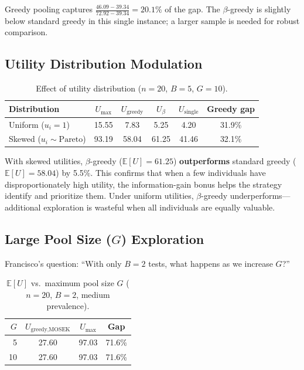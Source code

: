 \documentclass[11pt,a4paper]{article}
\newcommand{\E}{\mathbb{E}}
\begin{document}
Greedy pooling captures $\frac{46.09 - 39.34}{72.92 - 39.34} = 20.1\%$ of the gap.
The $\beta$-greedy is slightly below standard greedy in this single instance; a larger sample is needed for robust comparison.


\subsection{Utility Distribution Modulation}

\begin{table}[h]
\centering
\caption{Effect of utility distribution ($n=20$, $B=5$, $G=10$).}
\label{tab:utility_mod}
\begin{tabular}{lccccc}
\toprule
\textbf{Distribution} & $U_{\max}$ & $U_{\text{greedy}}$ & $U_{\beta}$ & $U_{\text{single}}$ & Greedy gap \\
\midrule
Uniform ($u_i=1$) & 15.55 & 7.83 & 5.25 & 4.20 & 31.9\% \\
Skewed ($u_i \sim \text{Pareto}$) & 93.19 & 58.04 & 61.25 & 41.46 & 32.1\% \\
\bottomrule
\end{tabular}
\end{table}

\begin{finding}
With skewed utilities, $\beta$-greedy ($\E[U]=61.25$) \textbf{outperforms} standard greedy ($\E[U]=58.04$) by 5.5\%.
This confirms that when a few individuals have disproportionately high utility, the information-gain bonus helps the strategy identify and prioritize them.
Under uniform utilities, $\beta$-greedy underperforms---additional exploration is wasteful when all individuals are equally valuable.
\end{finding}


\subsection{Large Pool Size ($G$) Exploration}

Francisco's question: ``With only $B=2$ tests, what happens as we increase $G$?''

\begin{table}[h]
\centering
\caption{$\E[U]$ vs.\ maximum pool size $G$ ($n=20$, $B=2$, medium prevalence).}
\label{tab:large_G}
\begin{tabular}{rccc}
\toprule
$G$ & $U_{\text{greedy,MOSEK}}$ & $U_{\max}$ & Gap \\
\midrule
5  & 27.60 & 97.03 & 71.6\% \\
10 & 27.60 & 97.03 & 71.6\% \\
\bottomrule
\end{tabular}
\end{table}
\end{document}
